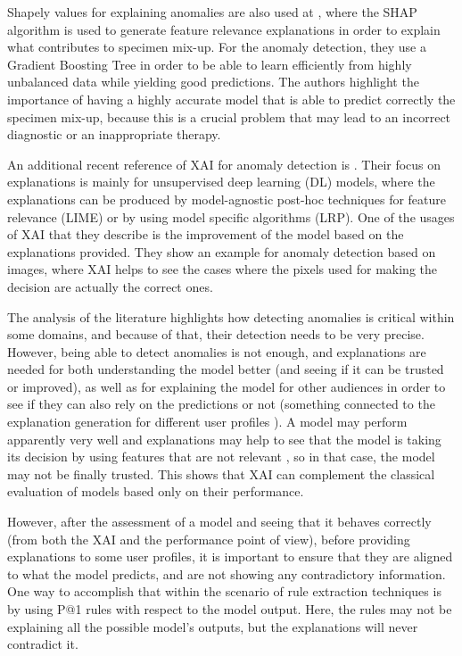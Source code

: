 Shapely values for explaining anomalies are also used at \parencite{mitani2020highly}, where the SHAP algorithm is used to generate feature relevance explanations in order to explain what contributes to specimen mix-up. For the anomaly detection, they use a Gradient Boosting Tree in order to be able to learn efficiently from highly unbalanced data while yielding good predictions. The authors highlight the importance of having a highly accurate model that is able to predict correctly the specimen mix-up, because this is a crucial problem that may lead to an incorrect diagnostic or an inappropriate therapy.

An additional recent reference of XAI for anomaly detection is \parencite{ruff2021unifying}. Their focus on explanations is mainly for unsupervised deep learning (DL) models, where the explanations can be produced by model-agnostic post-hoc techniques for feature relevance (LIME) or by using model specific algorithms (LRP). One of the usages of XAI that they describe is the improvement of the model based on the explanations provided. They show an example for anomaly detection based on images, where XAI helps to see the cases where the pixels used for making the decision are actually the correct ones.

The analysis of the literature highlights how detecting anomalies is critical within some domains, and because of that, their detection needs to be very precise. However, being able to detect anomalies is not enough, and explanations are needed for both understanding the model better (and seeing if it can be trusted or improved), as well as for explaining the model for other audiences in order to see if they can also rely on the predictions or not (something connected to the explanation generation for different user profiles \parencite{arrieta2020explainable}). A model may perform apparently very well and explanations may help to see that the model is taking its decision by using features that are not relevant \parencite{molnar2019interpretable}, so in that case, the model may not be finally trusted. This shows that XAI can complement the classical evaluation of models based only on their performance.

However, after the assessment of a model and seeing that it behaves correctly (from both the XAI and the performance point of view), before providing explanations to some user profiles, it is important to ensure that they are aligned to what the model predicts, and are not showing any contradictory information. One way to accomplish that within the scenario of rule extraction techniques is by using P@1 rules with respect to the model output. Here, the rules may not be explaining all the possible model's outputs, but the explanations will never contradict it.

